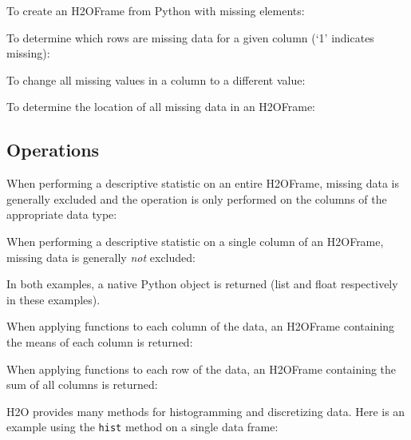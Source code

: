 {To create an H2OFrame from Python with missing elements:


To determine which rows are missing data for a given column (`1' indicates missing):


To change all missing values in a column to a different value:


\newpage

To determine the location of all missing data in an H2OFrame:


\subsection{Operations}
When performing a descriptive statistic on an entire H2OFrame, missing data is generally excluded
and the operation is only performed on the columns of the appropriate data type:


When performing a descriptive statistic on a single column of an H2OFrame, missing data is generally 
\textit{not} excluded:


In both examples,  a native Python object is returned (list and float respectively
in these examples).

\newpage

When applying functions to each column of the data, an H2OFrame containing the means of each column is returned:


When applying functions to each row of the data, an H2OFrame containing the sum of all columns is returned:


H2O provides many methods for histogramming and discretizing data.
Here is an example using the {\texttt{hist}} method on a single data frame:


}
